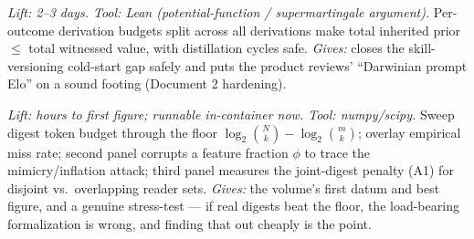 \documentclass[11pt,a4paper]{article}
\begin{document}
\begin{description}[leftmargin=0em,style=unboxed]
\item[A6. No-mint reputation inheritance.] \emph{Lift: 2--3 days. Tool: Lean (potential-function / supermartingale argument).} Per-outcome derivation budgets split across all derivations make total inherited prior $\le$ total witnessed value, with distillation cycles safe. \emph{Gives:} closes the skill-versioning cold-start gap safely and puts the product reviews' ``Darwinian prompt Elo'' on a sound footing (Document 2 hardening).

\item[A7. The information-floor falsification experiment.] \emph{Lift: hours to first figure; runnable in-container now. Tool: numpy/scipy.} Sweep digest token budget through the floor $\log_2\binom{N}{k}-\log_2\binom{m}{k}$; overlay empirical miss rate; second panel corrupts a feature fraction $\phi$ to trace the mimicry/inflation attack; third panel measures the joint-digest penalty (A1) for disjoint vs.\ overlapping reader sets. \emph{Gives:} the volume's first datum and best figure, and a genuine stress-test --- if real digests beat the floor, the load-bearing formalization is wrong, and finding that out cheaply is the point.
\end{description}
\end{document}
